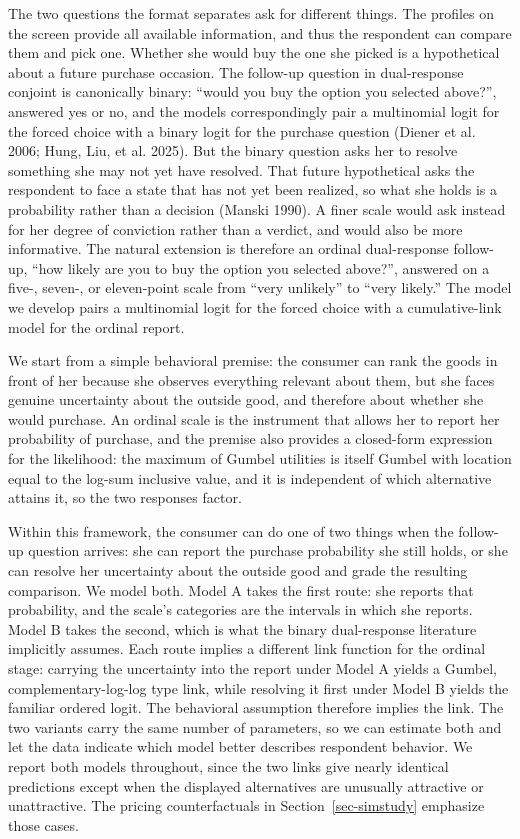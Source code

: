 \documentclass[
  letterpaper,
  DIV=11,
  numbers=noendperiod]{scrartcl}
\theoremstyle{plain}
\theoremstyle{plain}
\theoremstyle{remark}
\begin{document}
The two questions the format separates ask for different things. The
profiles on the screen provide all available information, and thus the
respondent can compare them and pick one. Whether she would buy the one
she picked is a hypothetical about a future purchase occasion. The
follow-up question in dual-response conjoint is canonically binary:
``would you buy the option you selected above?'', answered yes or no,
and the models correspondingly pair a multinomial logit for the forced
choice with a binary logit for the purchase question (Diener et al.
2006; Hung, Liu, et al. 2025). But the binary question asks her to
resolve something she may not yet have resolved. That future
hypothetical asks the respondent to face a state that has not yet been
realized, so what she holds is a probability rather than a decision
(Manski 1990). A finer scale would ask instead for her degree of
conviction rather than a verdict, and would also be more informative.
The natural extension is therefore an ordinal dual-response follow-up,
``how likely are you to buy the option you selected above?'', answered
on a five-, seven-, or eleven-point scale from ``very unlikely'' to
``very likely.'' The model we develop pairs a multinomial logit for the
forced choice with a cumulative-link model for the ordinal report.

We start from a simple behavioral premise: the consumer can rank the
goods in front of her because she observes everything relevant about
them, but she faces genuine uncertainty about the outside good, and
therefore about whether she would purchase. An ordinal scale is the
instrument that allows her to report her probability of purchase, and
the premise also provides a closed-form expression for the likelihood:
the maximum of Gumbel utilities is itself Gumbel with location equal to
the log-sum inclusive value, and it is independent of which alternative
attains it, so the two responses factor.

Within this framework, the consumer can do one of two things when the
follow-up question arrives: she can report the purchase probability she
still holds, or she can resolve her uncertainty about the outside good
and grade the resulting comparison. We model both. Model A takes the
first route: she reports that probability, and the scale's categories
are the intervals in which she reports. Model B takes the second, which
is what the binary dual-response literature implicitly assumes. Each
route implies a different link function for the ordinal stage: carrying
the uncertainty into the report under Model A yields a Gumbel,
complementary-log-log type link, while resolving it first under Model B
yields the familiar ordered logit. The behavioral assumption therefore
implies the link. The two variants carry the same number of parameters,
so we can estimate both and let the data indicate which model better
describes respondent behavior. We report both models throughout, since
the two links give nearly identical predictions except when the
displayed alternatives are unusually attractive or unattractive. The
pricing counterfactuals in Section~\ref{sec-simstudy} emphasize those
cases.
\end{document}
